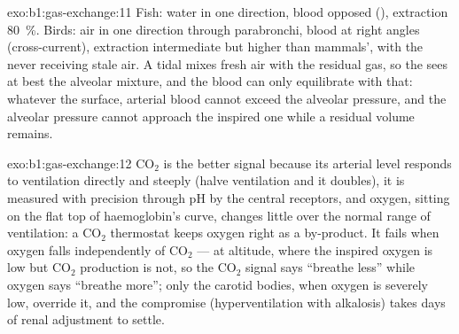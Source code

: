 \begin{solution}{exo:b1:gas-exchange:11}
Fish: water in one direction, blood opposed (),
extraction \qty{80}{\%}. Birds: air in one direction through
parabronchi, blood at right angles (cross-current), extraction
intermediate but higher than mammals', with the 
never receiving stale air. A tidal  mixes fresh air with the
residual gas, so the  sees at best the alveolar
mixture, and the blood can only equilibrate with that: whatever the
surface, arterial blood cannot exceed the alveolar pressure, and the
alveolar pressure cannot approach the inspired one while a residual
volume remains.
\end{solution}

\begin{solution}{exo:b1:gas-exchange:12}
$\mathrm{CO_2}$ is the better signal because its arterial level
responds to ventilation directly and steeply (halve ventilation and it
doubles), it is measured with precision through pH by the central
receptors, and oxygen, sitting on the flat top of haemoglobin's
curve, changes little over the normal range of ventilation: a
$\mathrm{CO_2}$ thermostat keeps oxygen right as a by-product. It fails
when oxygen falls independently of $\mathrm{CO_2}$ --- at altitude,
where the inspired oxygen is low but $\mathrm{CO_2}$ production is not,
so the $\mathrm{CO_2}$ signal says ``breathe less'' while oxygen says
``breathe more''; only the carotid bodies, when oxygen is severely low,
override it, and the compromise (hyperventilation with alkalosis) takes
days of renal adjustment to settle.
\end{solution}

